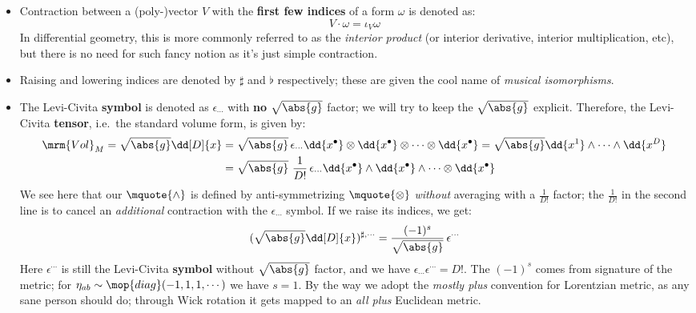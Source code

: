 \documentclass[a4paper
	,10pt
]{article}
\begin{document}
	\begin{itemize}
	\item Contraction between a (poly-)vector $V$ with the \textbf{first few indices} of a form $\omega$ is denoted as:
	\begin{equation}
		V\cdot \omega = \iota_V \omega
	\end{equation}
	In differential geometry, this is more commonly referred to as the \textit{interior product} (or interior derivative, interior multiplication, etc), but there is no need for such fancy notion as it's just simple contraction. 
	
	\item Raising and lowering indices are denoted by $\sharp$ and $\flat$ respectively; these are given the cool name of \textit{musical isomorphisms}. 
	
	\item The Levi-Civita \textbf{symbol} is denoted as $\epsilon_{\cdots}$ with \textbf{no} $\sqrt{\abs{g}}$ factor; we will try to keep the $\sqrt{\abs{g}}$ explicit. Therefore, the Levi-Civita \textbf{tensor}, i.e.~the standard volume form, is given by:
	\begin{equation}
	\begin{aligned}
		\mrm{Vol}_M
		= \sqrt{\abs{g}} \dd[D]{x}
		&= \sqrt{\abs{g}}\, \epsilon_{\cdots}
			\dd{x^\bullet} \otimes
			\dd{x^\bullet} \otimes
			\cdots \otimes
			\dd{x^\bullet}
		= \sqrt{\abs{g}} \dd{x^1} \wedge
			\cdots \wedge \dd{x^D} \\
		&= \sqrt{\abs{g}}
			\ \frac{1}{D!}\,
			\epsilon_{\cdots}
			\dd{x^\bullet} \wedge
			\dd{x^\bullet} \wedge
			\cdots \otimes
			\dd{x^\bullet}
	\end{aligned}
	\end{equation}
	We see here that our $\mquote{\wedge}$ is defined by anti-symmetrizing $\mquote{\otimes}$ \textit{without} averaging with a $\frac{1}{D!}$ factor; the $\frac{1}{D!}$ in the second line is to cancel an \textit{additional} contraction with the $\epsilon_{\cdots}$ symbol. 
	If we raise its indices, we get:
	\begin{equation}
		(\sqrt{\abs{g}} \dd[D]{x})^{\sharp,\cdots}
		= \frac{(-1)^s}{\sqrt{\abs{g}}}\,
			\epsilon^{\cdots}
	\end{equation}
	Here $\epsilon^{\cdots}$ is still the Levi-Civita \textbf{symbol} without $\sqrt{\abs{g}}$ factor, and we have $\epsilon_{\cdots} \epsilon^{\cdots} = D!$. The $(-1)^s$ comes from signature of the metric; for $
		\eta_{ab} \sim \mop{diag}(-1,1,1,\cdots)
	$ we have $s = 1$. By the way we adopt the \textit{mostly plus} convention for Lorentzian metric, as any sane person should do; through Wick rotation it gets mapped to an \textit{all plus} Euclidean metric. 
	

\end{itemize}
\end{document}
